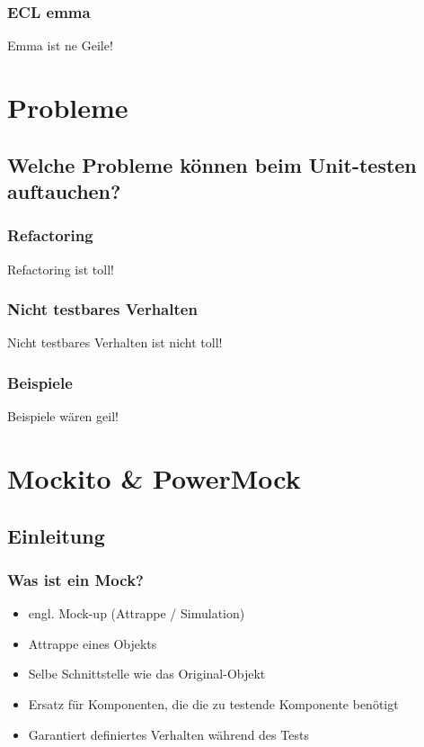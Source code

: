 \documentclass{beamer}
\begin{document}
			\begin{frame}
				\frametitle{ECL emma}
				Emma ist ne Geile!
			\end{frame}

	
	\section{Probleme}

		\subsection{Welche Probleme können beim Unit-testen auftauchen?}
		
			\begin{frame}
				\frametitle{Refactoring}
				Refactoring ist toll!
			\end{frame}

			\begin{frame}
				\frametitle{Nicht testbares Verhalten}
				Nicht testbares Verhalten ist nicht toll!
			\end{frame}

			\begin{frame}
				\frametitle{Beispiele}
				Beispiele wären geil!
			\end{frame}

	
	\section{Mockito \& PowerMock}
		\subsection{Einleitung}
			\begin{frame}
				\frametitle{Was ist ein Mock?}
				\begin{itemize}
					\item{engl. Mock-up (Attrappe / Simulation)}
					\item{Attrappe eines Objekts}
					\item{Selbe Schnittstelle wie das Original-Objekt}
					\item{Ersatz für Komponenten, die die zu testende Komponente benötigt}
					\item{Garantiert definiertes Verhalten während des Tests}
				\end{itemize}

			\end{frame}
\end{document}
